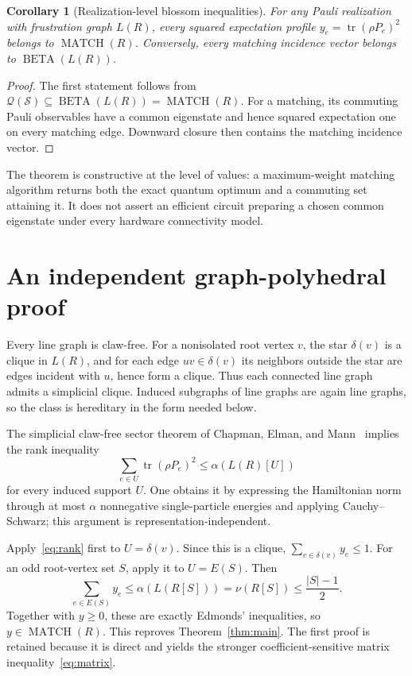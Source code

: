 \documentclass[11pt,a4paper]{article}
\newtheorem{corollary}[theorem]{Corollary}
\theoremstyle{remark}
\newcommand{\tr}{\operatorname{tr}}
\newcommand{\MATCH}{\operatorname{MATCH}}
\newcommand{\BETA}{\operatorname{BETA}}
\begin{document}
\begin{corollary}[Realization-level blossom inequalities]
For any Pauli realization with frustration graph $L(R)$, every squared
expectation profile $y_e=\tr(\rho P_e)^2$ belongs to $\MATCH(R)$. Conversely,
every matching incidence vector belongs to $\BETA(L(R))$.
\end{corollary}

\begin{proof}
The first statement follows from
$\mathcal Q(\mathcal S)\subseteq\BETA(L(R))=\MATCH(R)$. For a matching, its
commuting Pauli observables have a common eigenstate and hence squared
expectation one on every matching edge. Downward closure then contains the
matching incidence vector.
\end{proof}

The theorem is constructive at the level of values: a maximum-weight
matching algorithm returns both the exact quantum optimum and a commuting
set attaining it. It does not assert an efficient circuit preparing a chosen
common eigenstate under every hardware connectivity model.

\section{An independent graph-polyhedral proof}\label{sec:scf-proof}

Every line graph is claw-free. For a nonisolated root vertex $v$, the star
$\delta(v)$ is a clique in $L(R)$, and for each edge $uv\in\delta(v)$ its
neighbors outside the star are edges incident with $u$, hence form a clique.
Thus each connected line graph admits a simplicial clique. Induced subgraphs
of line graphs are again line graphs, so the class is hereditary in the form
needed below.

The simplicial claw-free sector theorem of Chapman, Elman, and Mann~\cite{cem}
implies the rank inequality
\begin{equation}\label{eq:rank}
 \sum_{e\in U}\tr(\rho P_e)^2\leq\alpha(L(R)[U])
\end{equation}
for every induced support $U$. One obtains it by expressing the Hamiltonian
norm through at most $\alpha$ nonnegative single-particle energies and applying
Cauchy--Schwarz; this argument is representation-independent.

Apply~\eqref{eq:rank} first to $U=\delta(v)$. Since this is a clique,
$\sum_{e\in\delta(v)}y_e\leq1$. For an odd root-vertex set $S$, apply it to
$U=E(S)$. Then
\[
 \sum_{e\in E(S)}y_e
 \leq\alpha(L(R[S]))=\nu(R[S])\leq\frac{|S|-1}{2}.
\]
Together with $y\geq0$, these are exactly Edmonds' inequalities, so
$y\in\MATCH(R)$. This reproves Theorem~\ref{thm:main}. The first proof is
retained because it is direct and yields the stronger coefficient-sensitive
matrix inequality~\eqref{eq:matrix}.
\end{document}
